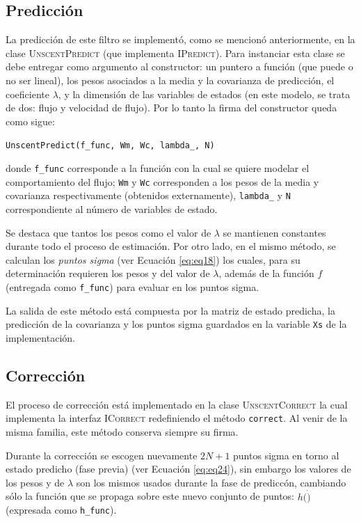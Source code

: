 \subsection{Predicci\'on}
La predicci\'on de este filtro se implement\'o, como se mencion\'o anteriormente, en la clase \textsc{UnscentPredict} (que implementa \textsc{IPredict}). Para instanciar esta clase se debe entregar como argumento al constructor: un puntero a funci\'on (que puede o no ser lineal), los pesos asociados a la media y la covarianza de predicci\'on, el coeficiente $\lambda$, y la dimensi\'on de las variables de estados (en este modelo, se trata de dos: flujo y velocidad de 
flujo). Por lo tanto la firma del constructor queda como sigue:
\bigskip
\begin{center}
\texttt{UnscentPredict(f\_func, Wm, Wc, lambda\_, N)}
\end{center}
\bigskip

donde \texttt{f\_func} corresponde a la funci\'on con la cual se quiere modelar el comportamiento del flujo; \texttt{Wm} y \texttt{Wc}  corresponden a los pesos de la media y covarianza respectivamente (obtenidos externamente), \texttt{lambda\_} y \texttt{N} correspondiente al n\'umero de variables de estado.
\bigskip

Se destaca que tantos los pesos como el valor de $\lambda$ se mantienen constantes durante todo el proceso de estimaci\'on. Por otro lado, en el mismo m\'etodo, se calculan los \textit{puntos sigma} (ver Ecuaci\'on \ref{eq:eq18}) los cuales, para su determinaci\'on requieren los pesos y del valor de $\lambda$, adem\'as de la funci\'on  $f$ (entregada como \texttt{f\_func}) para evaluar en los puntos sigma.
\bigskip

La salida de este m\'etodo est\'a compuesta por la matriz de estado predicha, la predicci\'on de la covarianza y los puntos sigma guardados en la variable \texttt{Xs} de la implementaci\'on.

\subsection{Correcci\'on}
El proceso de correcci\'on est\'a implementado en la clase \textsc{UnscentCorrect} la cual implementa la interfaz \textsc{ICorrect} redefiniendo el m\'etodo \texttt{correct}. Al venir de la misma familia, este m\'etodo conserva siempre su firma. 
\bigskip

Durante la correcci\'on se escogen nuevamente $2N+1$ puntos sigma en torno al estado predicho (fase previa) (ver Ecuaci\'on \ref{eq:eq24}), sin embargo los valores de los pesos y de $\lambda$ son los mismos usados durante la fase de predicc\'on, cambiando s\'olo la funci\'on que se propaga sobre este nuevo conjunto de puntos: $h(\dot)$ (expresada como \texttt{h\_func}). 
\bigskip

